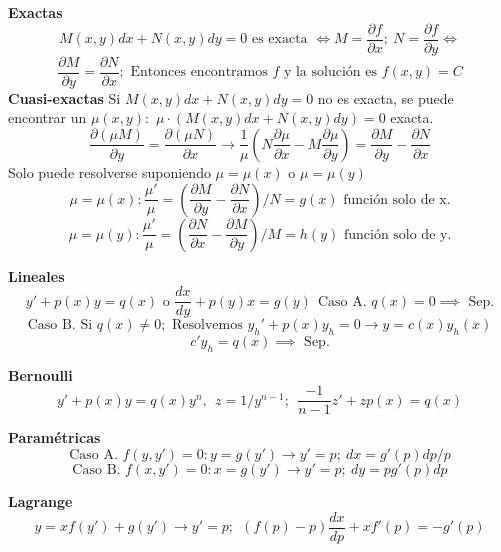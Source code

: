 \documentclass[10pt,landscape,letterpaper]{article}
\begin{document}
\begin{multicols}{3}
\textbf{Exactas}
\vspace{-6pt}
\[M(x,y)dx+N(x,y)dy=0 \mbox{ es exacta } \iff M=\frac{\partial f}{\partial x}; \ N=\frac{\partial f}{\partial y} \iff \]
\vspace{-10pt}
\[\frac{\partial M}{\partial y} = \frac{\partial N}{\partial x}; \mbox{ Entonces encontramos } f \mbox{ y la solución es } f(x,y)=C\]
\textbf{Cuasi-exactas}
Si $M(x,y)dx+N(x,y)dy=0$ no es exacta, se puede encontrar un $\mu(x,y):$
$\mu \cdot \left(M(x,y)dx+N(x,y)dy\right)=0$ exacta.
\[\frac{\partial(\mu M)}{\partial y}=\frac{\partial(\mu N)}{\partial x}\rightarrow \frac{1}{\mu}\left(N\frac{\partial \mu}{\partial x}-M\frac{\partial \mu}{\partial y}\right)=\frac{\partial M}{\partial y}-\frac{\partial N}{\partial x}\]
Solo puede resolverse suponiendo $\mu = \mu(x) \mbox{ o } \mu=\mu(y)$
\[\mu = \mu(x): \frac{\mu'}{\mu}=\left(\frac{\partial M}{\partial y}-\frac{\partial N}{\partial x}\right)/N=g(x) \mbox{ función solo de x.}\]
\vspace{-7pt}
\[\mu = \mu(y): \frac{\mu'}{\mu}=\left(\frac{\partial N}{\partial x}-\frac{\partial M}{\partial y}\right)/M=h(y) \mbox{ función solo de y.}\]
\vspace{-10pt}

\textbf{Lineales}
\vspace{-8pt}
\[y'+p(x)y=q(x) \mbox{ o } \frac{dx}{dy} + p(y)x=g(y) \ \ \boxed{\mbox{Caso A. } q(x)=0 \implies \mbox{ Sep.}}\]
\vspace{-5pt}
  \[\mbox{Caso B. Si } q(x) \neq 0; \mbox{ Resolvemos } y_h'+p(x)y_h=0 \rightarrow y=c(x)y_h(x)\]
  \[ c'y_h = q(x) \implies \mbox{ Sep.}\]
  \vspace{-18pt}

  \textbf{Bernoulli}
  \vspace{-5pt}
\[y'+p(x)y=q(x)y^n, \ \ z = 1/y^{n-1}; \ \ \frac{-1}{n-1} z' + zp(x)=q(x)\]
\vspace{-9pt}

\textbf{Paramétricas}
\vspace{-3pt}
  \[\mbox{Caso A. } f(y,y')=0 : y=g(y') \rightarrow y'=p; \ \boxed{dx =  g'(p) dp/p}\]
\vspace{-7pt}
  \[\mbox{Caso B. } f(x,y')=0 : x=g(y') \rightarrow y'=p;  \ \boxed{dy = p g'(p)dp}\]
  \vspace{-10pt}

  \textbf{Lagrange}
\vspace{-10pt}
\[y=xf(y')+g(y') \rightarrow y'=p; \ \ \boxed{(f(p)-p) \frac{dx}{dp} +xf'(p)=-g'(p)}\]
\vspace{-10pt}


\end{multicols}
\end{document}
